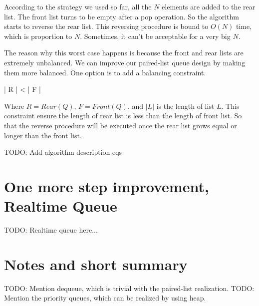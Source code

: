 \documentclass{article}
\begin{document}
According to the strategy we used so far, all the $N$ elements are added
to the rear list. The front list turns to be empty after a pop operation.
So the algorithm starts to reverse the rear list. This reversing procedure
is bound to $O(N)$ time, which is proportion to $N$. Sometimes, it can't be
acceptable for a very big $N$.

The reason why this worst case happens is because the front and rear lists
are extremely unbalanced. We can improve our paired-list queue design
by making them more balanced. One option is to add a balancing constraint.

\be
  | R | < | F |
\ee

Where $R = Rear(Q)$, $F = Front(Q)$, and $|L|$ is the length of list $L$. 
This constraint ensure the length
of rear list is less than the length of front list. So that the reverse
procedure will be executed once the rear list grows equal or longer than
the front list.

TODO: Add algorithm description eqs

\section{One more step improvement, Realtime Queue}

TODO: Realtime queue here...

\section{Notes and short summary}

TODO: Mention dequeue, which is trivial with the paired-list realization.
TODO: Mention the priority queues, which can be realized by using heap.

\end{document}

